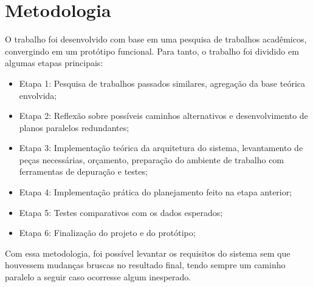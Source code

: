 \chapter{Metodologia}
\label{Métodos de implementação}

O trabalho foi desenvolvido com base em uma pesquisa de trabalhos acadêmicos, convergindo em um protótipo funcional. Para tanto, o trabalho foi dividido em algumas etapas principais:

\begin{itemize}
\item{Etapa 1: Pesquisa de trabalhos passados similares, agregação da base teórica envolvida;}
\item{Etapa 2: Reflexão sobre possíveis caminhos alternativos e desenvolvimento de planos paralelos redundantes;}
\item{Etapa 3: Implementação teórica da arquitetura do sistema, levantamento de peças necessárias, orçamento, preparação do ambiente de trabalho com ferramentas de depuração e testes;}
\item{Etapa 4: Implementação prática do planejamento feito na etapa anterior;}
\item{Etapa 5: Testes comparativos com os dados esperados;}
\item{Etapa 6: Finalização do projeto e do protótipo;}
\end{itemize}

Com essa metodologia, foi possível levantar os requisitos do sistema sem que houvessem mudanças bruscas no resultado final, tendo sempre um caminho paralelo a seguir caso ocorresse algum inesperado.